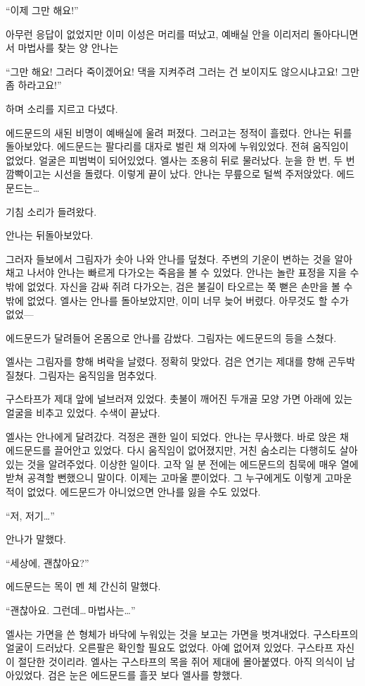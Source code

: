 ``이제 그만 해요!''

아무런 응답이 없었지만 이미 이성은 머리를 떠났고, 예배실 안을 이리저리 돌아다니면서 마법사를 찾는 양 안나는

``그만 해요! 그러다 죽이겠어요! 댁을 지켜주려 그러는 건 보이지도 않으시냐고요! 그만 좀 하라고요!''

하며 소리를 지르고 다녔다.

에드문드의 새된 비명이 예배실에 울려 퍼졌다. 그러고는 정적이 흘렀다. 안나는 뒤를 돌아보았다. 에드문드는 팔다리를 대자로 벌린 채 의자에 누워있었다. 전혀 움직임이 없었다. 얼굴은 피범벅이 되어있었다. 엘사는 조용히 뒤로 물러났다. 눈을 한 번, 두 번 깜빡이고는 시선을 돌렸다. 이렇게 끝이 났다. 안나는 무릎으로 털썩 주저앉았다. 에드문드는\ldots

기침 소리가 들려왔다.

안나는 뒤돌아보았다.

그러자 들보에서 그림자가 솟아 나와 안나를 덮쳤다. 주변의 기운이 변하는 것을 알아채고 나서야 안나는 빠르게 다가오는 죽음을 볼 수 있었다. 안나는 놀란 표정을 지을 수밖에 없었다. 자신을 감싸 쥐려 다가오는, 검은 불길이 타오르는 쭉 뻗은 손만을 볼 수밖에 없었다. 엘사는 안나를 돌아보았지만, 이미 너무 늦어 버렸다. 아무것도 할 수가 없었—

에드문드가 달려들어 온몸으로 안나를 감쌌다. 그림자는 에드문드의 등을 스쳤다.

엘사는 그림자를 향해 벼락을 날렸다. 정확히 맞았다. 검은 연기는 제대를 향해 곤두박질쳤다. 그림자는 움직임을 멈추었다.

구스타프가 제대 앞에 널브러져 있었다. 촛불이 깨어진 두개골 모양 가면 아래에 있는 얼굴을 비추고 있었다. 수색이 끝났다.

\textbreak

엘사는 안나에게 달려갔다. 걱정은 괜한 일이 되었다. 안나는 무사했다. 바로 앉은 채 에드문드를 끌어안고 있었다. 다시 움직임이 없어졌지만, 거친 숨소리는 다행히도 살아있는 것을 알려주었다. 이상한 일이다. 고작 일 분 전에는 에드문드의 침묵에 매우 열에 받쳐 공격할 뻔했으니 말이다. 이제는 고마울 뿐이었다. 그 누구에게도 이렇게 고마운 적이 없었다. 에드문드가 아니었으면 안나를 잃을 수도 있었다.

``저, 저기\ldots''

안나가 말했다.

``세상에, 괜찮아요?''

에드문드는 목이 멘 체 간신히 말했다.

``괜찮아요. 그런데\ldots\,마법사는\ldots''

엘사는 가면을 쓴 형체가 바닥에 누워있는 것을 보고는 가면을 벗겨내었다. 구스타프의 얼굴이 드러났다. 오른팔은 확인할 필요도 없었다. 아예 없어져 있었다. 구스타프 자신이 절단한 것이리라. 엘사는 구스타프의 목을 쥐어 제대에 몰아붙였다. 아직 의식이 남아있었다. 검은 눈은 에드문드를 흘끗 보다 엘사를 향했다.

